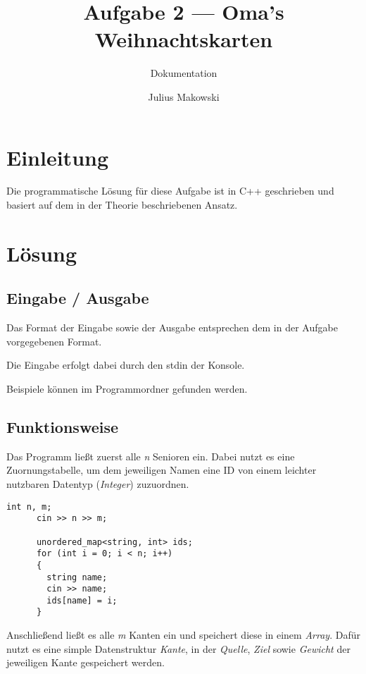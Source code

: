 \documentclass[12pt]{scrartcl}
\title{Aufgabe 2 --- Oma's Weihnachtskarten}
\subtitle{Dokumentation}
\author{Julius Makowski}
\date{}
\begin{document}
  \maketitle

  \section{Einleitung}
    Die programmatische L{\"o}sung f{\"u}r diese Aufgabe ist in C++ geschrieben und basiert auf dem in der Theorie beschriebenen Ansatz.

  \section{L{\"o}sung}
    \subsection{Eingabe / Ausgabe}
      Das Format der Eingabe sowie der Ausgabe entsprechen dem in der Aufgabe vorgegebenen Format.

      \vspace{12pt}\noindent
      Die Eingabe erfolgt dabei durch den stdin der Konsole.

      \vspace{12pt}\noindent
      Beispiele k{\"o}nnen im Programmordner gefunden werden.

    \pagebreak

    \subsection{Funktionsweise}
      Das Programm lie{\ss}t zuerst alle \textit{n} Senioren ein. Dabei nutzt es eine Zuornungstabelle, um dem jeweiligen Namen eine ID von einem leichter nutzbaren Datentyp (\textit{Integer}) zuzuordnen.
      
      \vspace{12pt}
      \begin{lstlisting}[style=c++]
      int n, m;
      cin >> n >> m;
      
      unordered_map<string, int> ids;
      for (int i = 0; i < n; i++)
      {
        string name;
        cin >> name;
        ids[name] = i;
      }
      \end{lstlisting}

      \vspace{12pt}\noindent
      Anschlie{\ss}end lie{\ss}t es alle \textit{m} Kanten ein und speichert diese in einem \textit{Array}. Daf{\"u}r nutzt es eine simple Datenstruktur \textit{Kante}, in der \textit{Quelle}, \textit{Ziel} sowie \textit{Gewicht} der jeweiligen Kante gespeichert werden.
\end{document}
